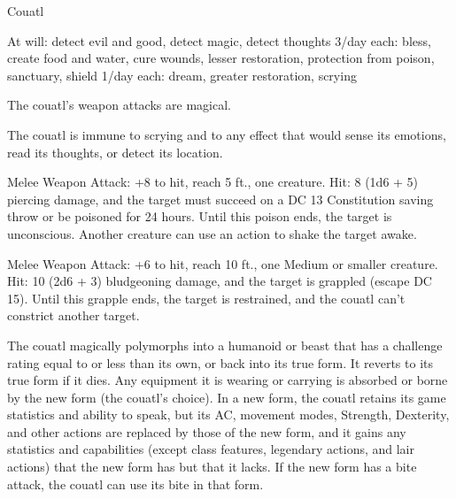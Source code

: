 \begin{monsterbox}{Couatl}
\begin{monsteraction}
At will: detect evil and good, detect magic, detect thoughts
3/day each: bless, create food and water, cure wounds, lesser restoration, protection from poison, sanctuary, shield
1/day each: dream, greater restoration, scrying
\end{monsteraction}
\begin{monsteraction}
The couatl's weapon attacks are magical.
\end{monsteraction}
\begin{monsteraction}
The couatl is immune to scrying and to any effect that would sense its emotions, read its thoughts, or detect its location.
\end{monsteraction}
\begin{monsteraction}[Bite]
Melee Weapon Attack: +8 to hit, reach 5 ft., one creature. Hit: 8 (1d6 + 5) piercing damage, and the target must succeed on a DC 13 Constitution saving throw or be poisoned for 24 hours. Until this poison ends, the target is unconscious. Another creature can use an action to shake the target awake.
\end{monsteraction}
\begin{monsteraction}[Constrict]
Melee Weapon Attack: +6 to hit, reach 10 ft., one Medium or smaller creature. Hit: 10 (2d6 + 3) bludgeoning damage, and the target is grappled (escape DC 15). Until this grapple ends, the target is restrained, and the couatl can't constrict another target.
\end{monsteraction}
\begin{monsteraction}
The couatl magically polymorphs into a humanoid or beast that has a challenge rating equal to or less than its own, or back into its true form. It reverts to its true form if it dies. Any equipment it is wearing or carrying is absorbed or borne by the new form (the couatl's choice).
In a new form, the couatl retains its game statistics and ability to speak, but its AC, movement modes, Strength, Dexterity, and other actions are replaced by those of the new form, and it gains any statistics and capabilities (except class features, legendary actions, and lair actions) that the new form has but that it lacks. If the new form has a bite attack, the couatl can use its bite in that form.
\end{monsteraction}
\end{monsterbox}